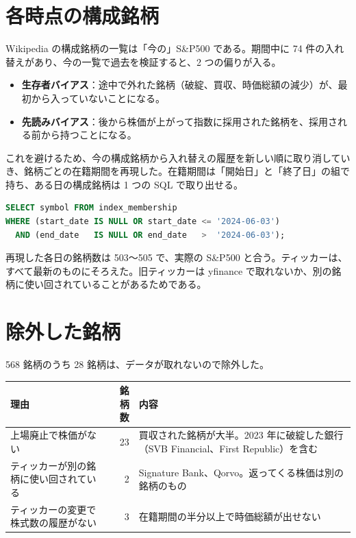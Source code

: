 \documentclass[xelatex,ja=standard,jafont=hiragino-pron,a4paper,10pt]{bxjsreport}
\newcommand{\SP}{S\&P500}
\begin{document}
\section{各時点の構成銘柄}

Wikipedia の構成銘柄の一覧は「今の」\SP{} である。期間中に 74 件の入れ替えがあり、今の一覧で過去を検証すると、2 つの偏りが入る。

\begin{itemize}
\item \textbf{生存者バイアス}：途中で外れた銘柄（破綻、買収、時価総額の減少）が、最初から入っていないことになる。
\item \textbf{先読みバイアス}：後から株価が上がって指数に採用された銘柄を、採用される前から持つことになる。
\end{itemize}

これを避けるため、今の構成銘柄から入れ替えの履歴を新しい順に取り消していき、銘柄ごとの在籍期間を再現した。在籍期間は「開始日」と「終了日」の組で持ち、ある日の構成銘柄は 1 つの SQL で取り出せる。

\begin{lstlisting}[language=SQL]
SELECT symbol FROM index_membership
WHERE (start_date IS NULL OR start_date <= '2024-06-03')
  AND (end_date   IS NULL OR end_date   >  '2024-06-03');
\end{lstlisting}

再現した各日の銘柄数は 503〜505 で、実際の \SP{} と合う。ティッカーは、すべて最新のものにそろえた。旧ティッカーは yfinance で取れないか、別の銘柄に使い回されていることがあるためである。

\section{除外した銘柄}

568 銘柄のうち 28 銘柄は、データが取れないので除外した。

\begin{longtable}{p{6.00cm}rp{7.00cm}}
\toprule
\textbf{理由} & \textbf{銘柄数} & \textbf{内容} \\
\midrule
\endfirsthead
\bottomrule
\endfoot
上場廃止で株価がない & 23 & 買収された銘柄が大半。2023 年に破綻した銀行（SVB Financial、First Republic）を含む \\
ティッカーが別の銘柄に使い回されている & 2 & Signature Bank、Qorvo。返ってくる株価は別の銘柄のもの \\
ティッカーの変更で株式数の履歴がない & 3 & 在籍期間の半分以上で時価総額が出せない \\
\end{longtable}
\end{document}
